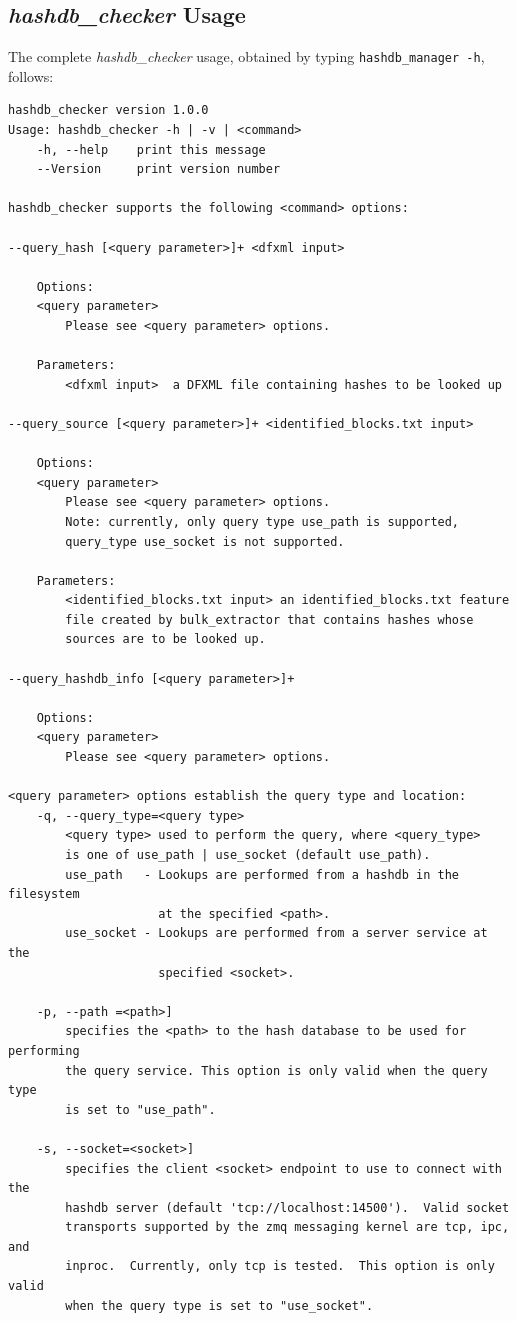 \documentclass[11pt,twoside]{article}
\newcommand \hdbc {\textit{hashdb\_checker}\xspace}
\begin{document}
\subsection{\hdbc Usage\label{hdbc-usage}}
The complete \hdbc usage,
obtained by typing \texttt{hashdb\_manager -h}, follows:
\begin{small}
\begin{verbatim}
hashdb_checker version 1.0.0
Usage: hashdb_checker -h | -v | <command>
    -h, --help    print this message
    --Version     print version number

hashdb_checker supports the following <command> options:

--query_hash [<query parameter>]+ <dfxml input>

    Options:
    <query parameter>
        Please see <query parameter> options.

    Parameters:
        <dfxml input>  a DFXML file containing hashes to be looked up

--query_source [<query parameter>]+ <identified_blocks.txt input>

    Options:
    <query parameter>
        Please see <query parameter> options.
        Note: currently, only query type use_path is supported,
        query_type use_socket is not supported.

    Parameters:
        <identified_blocks.txt input> an identified_blocks.txt feature
        file created by bulk_extractor that contains hashes whose
        sources are to be looked up.

--query_hashdb_info [<query parameter>]+

    Options:
    <query parameter>
        Please see <query parameter> options.

<query parameter> options establish the query type and location:
    -q, --query_type=<query type>
        <query type> used to perform the query, where <query_type>
        is one of use_path | use_socket (default use_path).
        use_path   - Lookups are performed from a hashdb in the filesystem
                     at the specified <path>.
        use_socket - Lookups are performed from a server service at the
                     specified <socket>.

    -p, --path =<path>]
        specifies the <path> to the hash database to be used for performing
        the query service. This option is only valid when the query type
        is set to "use_path".

    -s, --socket=<socket>]
        specifies the client <socket> endpoint to use to connect with the
        hashdb server (default 'tcp://localhost:14500').  Valid socket
        transports supported by the zmq messaging kernel are tcp, ipc, and
        inproc.  Currently, only tcp is tested.  This option is only valid
        when the query type is set to "use_socket".
\end{verbatim}
\end{small}
\end{document}
